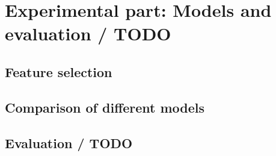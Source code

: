 \chapter{Experimental part: Models and evaluation / TODO}
\label{chap:model}

\section{Feature selection}

\section{Comparison of different models}

\section{Evaluation / TODO}
\label{sec:eval}